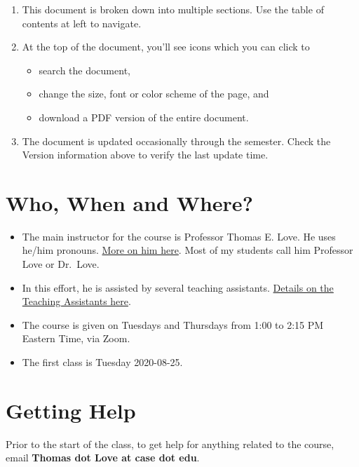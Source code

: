 \documentclass[
]{book}
\providecommand{\tightlist}{%
  \setlength{\itemsep}{0pt}\setlength{\parskip}{0pt}}
\begin{document}
\begin{enumerate}
\def\labelenumi{\arabic{enumi}.}
\tightlist
\item
  This document is broken down into multiple sections. Use the table of contents at left to navigate.
\item
  At the top of the document, you'll see icons which you can click to

  \begin{itemize}
  \tightlist
  \item
    search the document,
  \item
    change the size, font or color scheme of the page, and
  \item
    download a PDF version of the entire document.
  \end{itemize}
\item
  The document is updated occasionally through the semester. Check the Version information above to verify the last update time.
\end{enumerate}

\hypertarget{who-when-and-where}{%
\section*{Who, When and Where?}\label{who-when-and-where}}

\begin{itemize}
\tightlist
\item
  The main instructor for the course is Professor Thomas E. Love. He uses he/him pronouns. \protect\hyperlink{professor-love}{More on him here}. Most of my students call him Professor Love or Dr.~Love.
\item
  In this effort, he is assisted by several teaching assistants. \protect\hyperlink{teaching-assistants}{Details on the Teaching Assistants here}.
\item
  The course is given on Tuesdays and Thursdays from 1:00 to 2:15 PM Eastern Time, via Zoom.
\item
  The first class is Tuesday 2020-08-25.
\end{itemize}

\hypertarget{getting-help}{%
\section*{Getting Help}\label{getting-help}}

Prior to the start of the class, to get help for anything related to the course, email \textbf{Thomas dot Love at case dot edu}.
\end{document}
